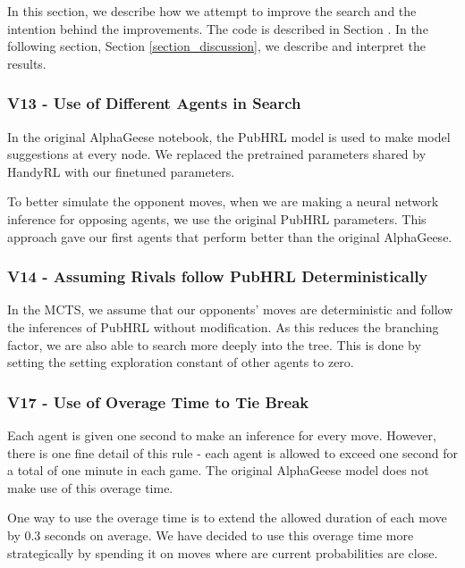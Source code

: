 In this section, we describe how we attempt to improve the search and the intention behind the improvements. The code is described in Section \label{subsection_code_submission}. In the following section, Section \ref{section_discussion}, we describe and interpret the results.

\subsubsection{V13 - Use of Different Agents in Search}
\label{subsubsection_v13}

In the original AlphaGeese notebook, the PubHRL model is used to make model suggestions at every node. We replaced the pretrained parameters shared by HandyRL with our finetuned parameters.

To better simulate the opponent moves, when we are making a neural network inference for opposing agents, we use the original PubHRL parameters. This approach gave our first agents that perform better than the original AlphaGeese.

\subsubsection{V14 - Assuming Rivals follow PubHRL Deterministically}
\label{subsubsection_v14}

In the MCTS, we assume that our opponents' moves are deterministic and follow the inferences of PubHRL without modification. As this reduces the branching factor, we are also able to search more deeply into the tree. This is done by setting the setting exploration constant of other agents to zero.

\subsubsection{V17 - Use of Overage Time to Tie Break}
\label{subsubsection_v17}

Each agent is given one second to make an inference for every move. However, there is one fine detail of this rule - each agent is allowed to exceed one second for a total of one minute in each game. The original AlphaGeese model does not make use of this overage time.

One way to use the overage time is to extend the allowed duration of each move by 0.3 seconds on average. We have decided to use this overage time more strategically by spending it on moves where are current probabilities are close.

